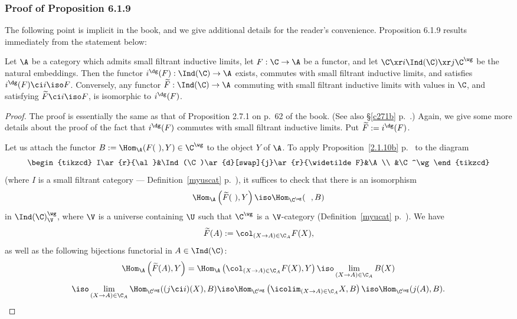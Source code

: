 \documentclass[12pt]{article}
\theoremstyle{remark}
\theoremstyle{definition}
\begin{document}


\subsubsection{Proof of Proposition 6.1.9}

The following point is implicit in the book, and we give additional details for the reader's convenience. Proposition 6.1.9 results immediately from the statement below:

\begin{prop} 
Let $\A$ be a category which admits small filtrant inductive limits, let $F:\C\to\A$ be a functor, and let $\C\xr i\Ind(\C)\xr j\C^\wg$ be the natural embeddings. Then the functor $i^\dg(F):\Ind(\C)\to\A$ exists, commutes with small filtrant inductive limits, and satisfies $i^\dg(F)\ci i\iso F$. Conversely, any functor $\widetilde F:\Ind(\C)\to\A$ commuting with small filtrant inductive limits with values in $\C$, and satisfying $\widetilde F\ci i\iso F$, is isomorphic to $i^\dg(F)$. 
\end{prop} 

\begin{proof}
The proof is essentially the same as that of Proposition 2.7.1 on p.~62 of the book. (See also \S\ref{c271b} p.~.) Again, we give some more details about the proof of the fact that $i^\dg(F)$ commutes with small filtrant inductive limits. Put $\widetilde F:=i^\dg(F)$. 

Let us attach the functor $B:=\Hom_\A(F(\ ),Y)\in\C^\wg$ to the object $Y$ of $\A$. To apply Proposition~\ref{2.1.10b} p.~ to the diagram 
$$
\begin{tikzcd}
I\ar{r}{\al}&\Ind(\C)\ar{d}[swap]{j}\ar{r}{\widetilde F}&\A\\
&\C^\wg
\end{tikzcd}
$$
(where $I$ is a small filtrant category --- Definition~\ref{myuscat} p.~), it suffices to check that there is an isomorphism 
$$
\Hom_\A\left(\widetilde F(\ ),Y\right)\iso\Hom_{\C^\wg}(\ \ ,B)
$$ 
in $\Ind(\C)^\wg_\V$, where $\V$ is a universe containing $\U$ such that $\C^\wg$ is a $\V$-category (Definition~\ref{myucat} p.~). We have 
$$
\widetilde F(A):=\col_{(X\to A)\in\C_A}F(X),
$$ 
as well as the following bijections functorial in $A\in\Ind(\C)$:
$$
\Hom_\A\left(\widetilde F(A),Y\right)=\Hom_\A\left(\col_{(X\to A)\in\C_A}F(X),Y\right)\iso\lim_{(X\to A)\in\C_A}B(X)
$$
$$
\iso\lim_{(X\to A)\in\C_A}\Hom_{\C^\wg}((j\ci i)(X),B)\iso\Hom_{\C^\wg}\left(\icolim_{(X\to A)\in\C_A}X,B\right)\iso\Hom_{\C^\wg}(j(A),B).
$$
\end{proof}
\end{document}

